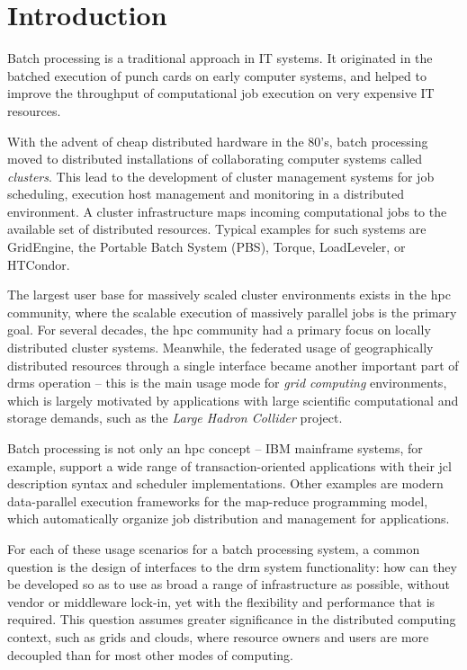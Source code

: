 \documentclass[twocolumn]{svjour3}       %
\begin{document}
\sloppy

\section{Introduction}
\label{intro}

Batch processing is a traditional approach in IT systems. It originated in the batched execution of punch cards on early computer systems, and helped to improve the throughput of computational job execution on very expensive IT resources.  

 With the advent of cheap distributed hardware in the 80's, batch processing moved to distributed installations of collaborating computer systems called \emph{clusters}. This lead to the development of cluster management systems for job scheduling, execution host management and monitoring in a distributed environment. A cluster infrastructure maps incoming computational jobs to the available set of distributed resources. Typical examples for such systems are GridEngine, the Portable Batch System (PBS), Torque, LoadLeveler, or HTCondor.  

 The largest user base for massively scaled cluster environments exists in the \gls{hpc} community, where the scalable execution of massively parallel jobs is the primary goal. For several decades, the \gls{hpc} community had a primary focus on locally distributed cluster systems. Meanwhile, the federated usage of geographically distributed resources through a single interface became another important part of \gls{drms} operation -- this is the main usage mode for \emph{grid computing} environments, which is largely motivated by applications with large scientific computational and storage demands, such as the \emph{Large Hadron Collider} project. 

 Batch processing is not only an \gls{hpc} concept -- IBM mainframe systems, for example, support a wide range of transaction-oriented applications with their \gls{jcl} description syntax and scheduler implementations. Other examples are modern data-parallel execution frameworks for the map-reduce programming model, which automatically organize job distribution and management for applications.

For each of these usage scenarios for a batch processing system, a common question is the design of interfaces to the \gls{drm} system functionality: how can they be developed so as to use as broad a range of infrastructure as possible, without vendor or middleware lock-in, yet with the flexibility and performance that is required. This question assumes greater significance in the distributed computing context, such as grids and clouds, where resource owners and users are more decoupled than for most other modes of computing.
\end{document}
